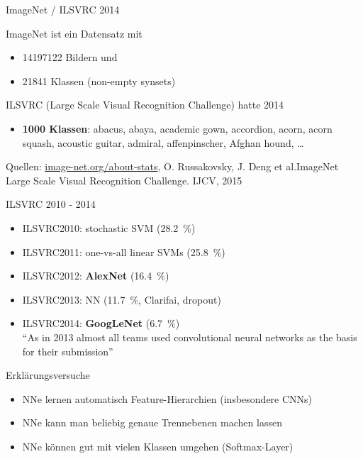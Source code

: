 \documentclass{beamer}
\begin{document}
\begin{frame}[plain]{ImageNet / ILSVRC 2014}

ImageNet ist ein Datensatz mit
\begin{itemize}
    \item \num{14197122} Bildern und
    \item \num{21841} Klassen (non-empty synsets)
\end{itemize}



ILSVRC (Large Scale Visual Recognition Challenge) hatte 2014

\begin{itemize}
    \item \textbf{1000 Klassen}: abacus, abaya, academic gown, accordion,
    acorn, acorn squash, acoustic guitar, admiral, affenpinscher, Afghan hound,
    \dots
\end{itemize}

Quellen: \href{http://image-net.org/about-stats}{image-net.org/about-stats},
O. Russakovsky, J. Deng et al.ImageNet Large Scale Visual Recognition Challenge. IJCV, 2015
\end{frame}


\begin{frame}[plain]{ILSVRC 2010 - 2014}
    \begin{itemize}
        \item ILSVRC2010: stochastic SVM (\SI{28.2}{\percent})
        \item ILSVRC2011: one-vs-all linear SVMs (\SI{25.8}{\percent})
        \item ILSVRC2012: \textbf{AlexNet} (\SI{16.4}{\percent})
        \item ILSVRC2013: NN (\SI{11.7}{\percent}, Clarifai, dropout)
        \item ILSVRC2014: \textbf{GoogLeNet} (\SI{6.7}{\percent})\\
              \enquote{As in 2013 almost all teams used convolutional neural networks as the basis for their submission}
    \end{itemize}
\end{frame}

\begin{frame}[plain]{Erklärungsversuche}
    \begin{itemize}
        \item NNe lernen automatisch Feature-Hierarchien (insbesondere CNNs)
        \item NNe kann man beliebig genaue Trennebenen machen lassen
        \item NNe können gut mit vielen Klassen umgehen (Softmax-Layer)
    \end{itemize}
\end{frame}
\end{document}
